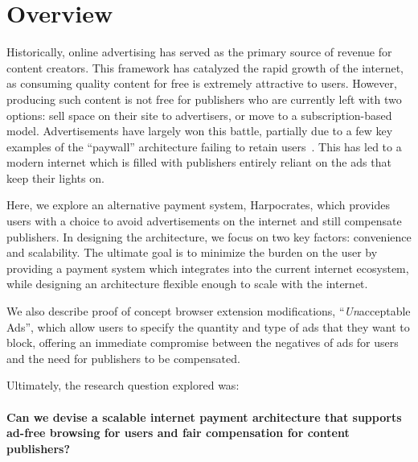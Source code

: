 
\section{Overview}
Historically, online advertising has served as the primary source of revenue for content creators.
This framework has catalyzed the rapid growth of the internet, as consuming quality content for free is extremely attractive to users.
However, producing such content is not free for publishers who are currently left with two options: sell space on their site to advertisers, or move to a subscription-based model.
Advertisements have largely won this battle, partially due to a few key examples of the “paywall” architecture failing to retain users~\cite{nyt}.
This has led to a modern internet which is filled with publishers entirely reliant on the ads that keep their lights on.

Here, we explore an alternative payment system, Harpocrates, which provides users with a choice to avoid advertisements on the internet and still compensate publishers.
In designing the architecture, we focus on two key factors: convenience and scalability.
The ultimate goal is to minimize the burden on the user by providing a payment system which integrates into the current internet ecosystem, while designing an architecture flexible enough to scale with the internet.

We also describe proof of concept browser extension modifications, ``\textit{Un}acceptable Ads'', which allow users to specify the quantity and type of ads that they want to block, offering an immediate compromise between the negatives of ads for users and the need for publishers to be compensated.

Ultimately, the research question explored was: \\
\\
\textbf{Can we devise a scalable internet payment architecture that supports ad-free browsing for users and fair compensation for content publishers?}
